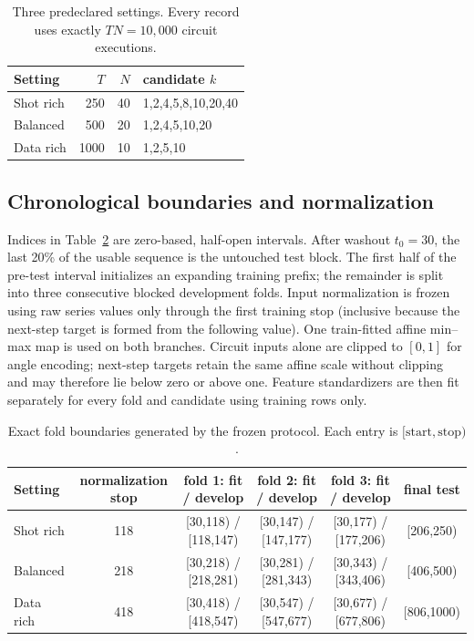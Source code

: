 \documentclass[10pt,conference]{IEEEtran}
\begin{document}
\begin{table}[t]
\caption{Three predeclared settings.  Every record uses exactly $TN=10{,}000$
circuit executions.}
\label{tab:supp-budget}
\centering
\begin{tabular}{lrrl}
\toprule
Setting & $T$ & $N$ & candidate $k$ \\
\midrule
Shot rich & 250 & 40 & 1,2,4,5,8,10,20,40 \\
Balanced  & 500 & 20 & 1,2,4,5,10,20 \\
Data rich & 1000& 10 & 1,2,5,10 \\
\bottomrule
\end{tabular}
\end{table}

\subsection{Chronological boundaries and normalization}

Indices in Table~\ref{tab:supp-folds} are zero-based, half-open intervals.
After washout $t_0=30$, the last 20\% of the usable sequence is the untouched
test block.  The first half of the pre-test interval initializes an expanding
training prefix; the remainder is split into three consecutive blocked
development folds. Input normalization is frozen using raw series values only
through the first training stop (inclusive because the next-step target is
formed from the following value).  One train-fitted affine min--max map is used
on both branches.  Circuit inputs alone are clipped to $[0,1]$ for angle
encoding; next-step targets retain the same affine scale without clipping and
may therefore lie below zero or above one.  Feature standardizers are then fit
separately for every fold and candidate using training rows only.

\begin{table}[t]
\caption{Exact fold boundaries generated by the frozen protocol.  Each entry
is $[\mathrm{start},\mathrm{stop})$.}
\label{tab:supp-folds}
\centering
\begin{tabular}{lccccc}
\toprule
Setting & normalization stop & fold 1: fit / develop & fold 2: fit / develop & fold 3: fit / develop & final test \\
\midrule
Shot rich & 118 & [30,118) / [118,147) & [30,147) / [147,177) & [30,177) / [177,206) & [206,250) \\
Balanced  & 218 & [30,218) / [218,281) & [30,281) / [281,343) & [30,343) / [343,406) & [406,500) \\
Data rich & 418 & [30,418) / [418,547) & [30,547) / [547,677) & [30,677) / [677,806) & [806,1000) \\
\bottomrule
\end{tabular}
\end{table}
\end{document}
